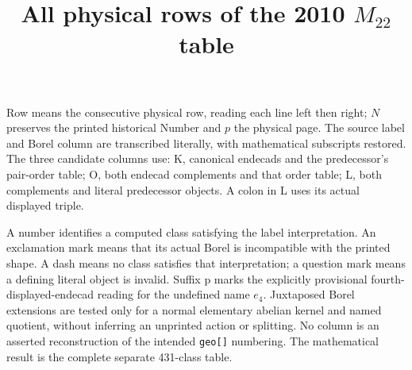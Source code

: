 \documentclass[11pt,a4paper]{article}
\title{All physical rows of the 2010 $M_{22}$ table}\author{}\date{}
\begin{document}
\maketitle
Row means the consecutive physical row, reading each line left then right; $N$ preserves the printed historical Number and $p$ the physical page. The source label and Borel column are transcribed literally, with mathematical subscripts restored. The three candidate columns use: K, canonical endecads and the predecessor's pair-order table; O, both endecad complements and that order table; L, both complements and literal predecessor objects. A colon in L uses its actual displayed triple.

A number identifies a computed class satisfying the label interpretation. An exclamation mark means that its actual Borel is incompatible with the printed shape. A dash means no class satisfies that interpretation; a question mark means a defining literal object is invalid. Suffix p marks the explicitly provisional fourth-displayed-endecad reading for the undefined name $e_4$. Juxtaposed Borel extensions are tested only for a normal elementary abelian kernel and named quotient, without inferring an unprinted action or splitting. No column is an asserted reconstruction of the intended \texttt{geo[]} numbering. The mathematical result is the complete separate 431-class table.
\small
\end{document}
